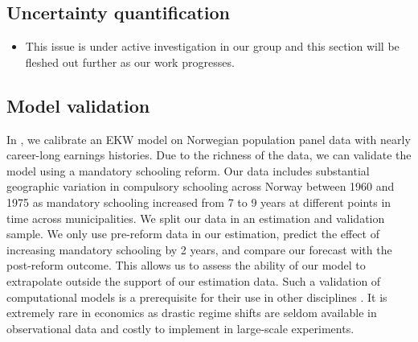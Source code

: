 \subsection{Uncertainty quantification}

\begin{itemize}
  \item This issue is under active investigation in our group and this section will be fleshed out further as our work progresses.
\end{itemize}

\subsection{Model validation} In \citet{Bhuller.2018}, we calibrate an EKW model on Norwegian population panel data with nearly career-long earnings histories. Due to the richness of the data, we can validate the model using a mandatory schooling reform. Our data includes substantial geographic variation in compulsory schooling across Norway between 1960 and 1975 as mandatory schooling increased from 7 to 9 years at different points in time across municipalities. We split our data in an estimation and validation sample. We only use pre-reform data in our estimation, predict the effect of increasing mandatory schooling by 2 years, and compare our forecast with the post-reform outcome. This allows us to assess the ability of our model to extrapolate outside the support of our estimation data. Such a validation of computational models is a prerequisite for their use in other disciplines \citep{Adams.2012,Oberkampf.2010}. It is extremely rare in economics as drastic regime shifts are seldom available in observational data and costly to implement in large-scale experiments.
